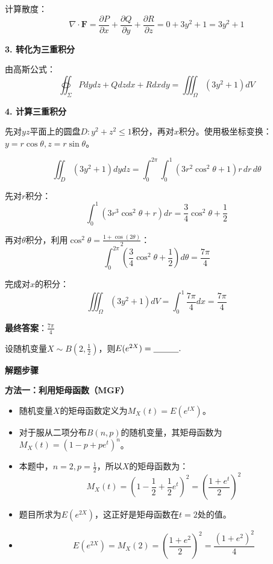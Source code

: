 \documentclass[standard]{ExBook}
\begin{document}
\begin{qitems}
\begin{bbox}
\begin{solution}
            计算散度：
            $$\nabla \cdot \mathbf{F} = \frac{\partial P}{\partial x} + \frac{\partial Q}{\partial y} + \frac{\partial R}{\partial z} = 0 + 3y^2 + 1 = 3y^2+1$$
            
            \textbf{3. 转化为三重积分}
            
            由高斯公式：
            $$\oiint_{\Sigma} Pdydz + Qdzdx + Rdxdy = \iiint_{\Omega} (3y^2+1) dV$$
            
            \textbf{4. 计算三重积分}
            
            先对$yz$平面上的圆盘$D: y^2+z^2\le 1$积分，再对$x$积分。使用极坐标变换：$y=r\cos\theta, z=r\sin\theta$。
            
            $$\iint_{D} (3y^2+1) dydz = \int_0^{2\pi} \int_0^1 (3r^2\cos^2\theta+1) r\, dr\, d\theta$$
            
            先对$r$积分：
            $$\int_0^1 (3r^3\cos^2\theta+r) dr = \frac{3}{4}\cos^2\theta + \frac{1}{2}$$
            
            再对$\theta$积分，利用$\cos^2\theta = \frac{1+\cos(2\theta)}{2}$：
            $$\int_0^{2\pi} \left(\frac{3}{4}\cos^2\theta + \frac{1}{2}\right) d\theta = \frac{7\pi}{4}$$
            
            完成对$x$的积分：
            $$\iiint_{\Omega} (3y^2+1) dV = \int_0^1 \frac{7\pi}{4} dx = \frac{7\pi}{4}$$
            
            \textbf{最终答案}：$\frac{7\pi}{4}$
        \end{solution}
    \end{bbox}

    \begin{bbox}
        \qitem 设随机变量$X\sim B(2, \frac{1}{2})$，则$E(e^{2X})=\underline{\hspace{3em}}.$
        \begin{solution}
            \textbf{解题步骤}
            
            \textbf{方法一：利用矩母函数（MGF）}
            
            \begin{itemize}
                \item 随机变量$X$的矩母函数定义为$M_X(t)=E(e^{tX})$。
                \item 对于服从二项分布$B(n,p)$的随机变量，其矩母函数为$M_X(t)=(1-p+pe^t)^n$。
                \item 本题中，$n=2, p=\frac{1}{2}$，所以$X$的矩母函数为：
                    $$M_X(t) = (1-\frac{1}{2}+\frac{1}{2}e^t)^2 = \left(\frac{1+e^t}{2}\right)^2$$
                \item 题目所求为$E(e^{2X})$，这正好是矩母函数在$t=2$处的值。
                \item $$E(e^{2X}) = M_X(2) = \left(\frac{1+e^2}{2}\right)^2 = \frac{(1+e^2)^2}{4}$$
            \end{itemize}
            

\end{solution}
\end{bbox}
\end{qitems}
\end{document}

